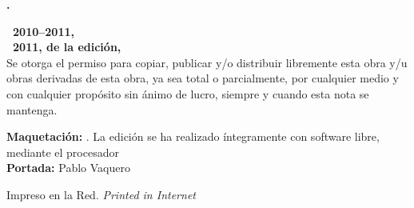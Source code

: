 \noindent
\textbf{\thetitle. \ \thesubtitle}\\
\theauthor

\bigskip\bigskip\footnotesize\noindent
\textbf{\copyleft\ 2010--2011, \theauthor}\\
\textbf{\copyleft\ 2011, de la edición, \theeditor}\\
Se otorga el permiso para copiar, publicar y/o distribuir libremente esta obra y/u obras derivadas de esta obra, ya sea total o parcialmente, por cualquier medio y con cualquier propósito sin ánimo de lucro, siempre y cuando esta nota se mantenga.

\bigskip\noindent
\textbf{Maquetación:} \theeditor. La edición se ha realizado íntegramente con software libre, mediante el procesador \emph{\LaTeXe}\\
\textbf{Portada:} Pablo Vaquero

\bigskip\noindent
Impreso en la Red. \emph{Printed in Internet}
\normalsize
{}

\endinput
